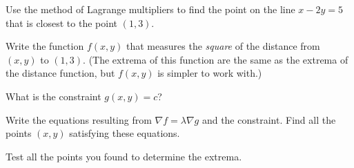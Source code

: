 \begin{activity} \label{A:10.8.4} 
  Use the method of Lagrange multipliers to find the point on the line 
  $x-2y=5$ that is closest to the point $(1,3)$.
  \ba
  \item Write the function $f(x,y)$ that measures the {\em square} of
    the distance from $(x,y)$ to $(1,3)$.  (The extrema of this
    function are the same as the extrema of the distance function, but
    $f(x,y)$ is simpler to work with.)
  \item What is the constraint $g(x,y) = c$?
  \item Write the equations resulting from $\nabla f = \lambda \nabla
    g$ and the constraint.  Find all the points
    $(x,y)$ satisfying these equations.
  \item Test all the points you found to determine the extrema.

    \ea

\end{activity}

\aftera

